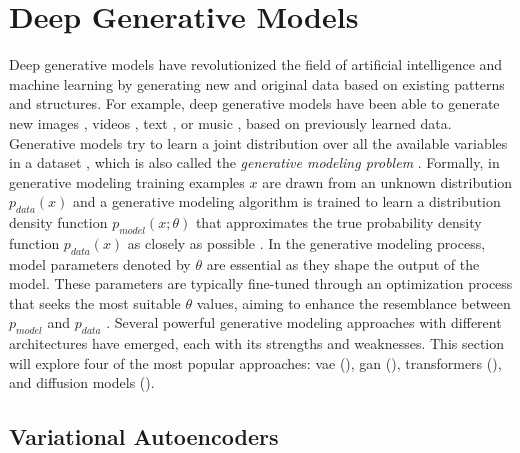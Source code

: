\section{Deep Generative Models}
\label{ch:preliminaries-generativeMlgorithms}

Deep generative models have revolutionized the field of artificial intelligence and machine learning by generating new and original data based on existing patterns and structures.
For example, deep generative models have been able to generate new images \cite{ho2020DenoisingDiffusionProbabilistic}, videos \cite{ho2022VideoDiffusionModels}, text \cite{openai2022ChatGPTOptimizingLanguage}, or music \cite{agostinelli2023MusicLMGeneratingMusic}, based on previously learned data. 
Generative models try to learn a joint distribution over all the available variables in a dataset \cite{kingma2019IntroductionVariationalAutoencoders}, which is also called the \textit{generative modeling problem} \cite{goodfellow2020GenerativeAdversarialNetworks}.
Formally, in generative modeling training examples $x$ are drawn from an unknown distribution $p_{data}(x)$ and a generative modeling algorithm is trained to learn a distribution density function $p_{model}(x;\theta)$ that approximates the true probability density function $p_{data}(x)$ as closely as possible \cite[p. 139]{goodfellow2020GenerativeAdversarialNetworks}.
In the generative modeling process, model parameters denoted by $\theta$ are essential as they shape the output of the model. 
These parameters are typically fine-tuned through an optimization process that seeks the most suitable $\theta$ values, aiming to enhance the resemblance between $p_{model}$ and $p_{data}$ \cite[p. 139]{goodfellow2020GenerativeAdversarialNetworks}.
Several powerful generative modeling approaches with different architectures have emerged, each with its strengths and weaknesses. 
This section will explore four of the most popular approaches: \acrfull{vae} (), \acrfull{gan} (), transformers (), and diffusion models (). 

\subsection{Variational Autoencoders}
\label{ch:preliminaries-variationalAutoencoders} 

